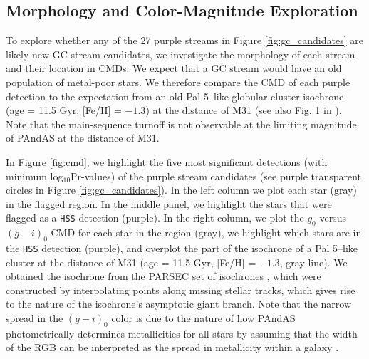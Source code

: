 \documentclass[twocolumn]{aastex631}
\begin{document}
\subsection{Morphology and Color-Magnitude Exploration}\label{sec:CMD}
To explore whether any of the 27 purple streams in Figure \ref{fig:gc_candidates} are likely new GC stream candidates, we investigate the morphology of each stream and their location in CMDs. 
We expect that a GC stream would have an old population of metal-poor stars. We therefore compare the CMD of each purple detection to the expectation from an old Pal 5--like globular cluster isochrone (age = 11.5 Gyr, [Fe/H] = $-1.3$) at the distance of M31 (see also Fig. 1 in ). Note that the main-sequence turnoff is not observable at the limiting magnitude of PAndAS at the distance of M31. 


In Figure \ref{fig:cmd}, we highlight the five most significant detections (with minimum log$_{10}$Pr-values) of the purple stream candidates (see purple transparent circles in Figure \ref{fig:gc_candidates}). 
In the left column we plot each star (gray) in the flagged region. In the middle panel, we highlight the stars that were flagged as a \texttt{HSS} detection (purple). In the right column, we plot the $g_0$ versus $(g-i)_0$ CMD for each star in the region (gray), we highlight which stars are in the \texttt{HSS} detection (purple), and overplot the part of the isochrone of a Pal 5--like cluster at the distance of M31 (age = 11.5 Gyr, [Fe/H] = $-1.3$,  gray line). We obtained the isochrone from the PARSEC set of isochrones \citep{bressan12}, which were constructed by interpolating points along missing stellar tracks, which gives rise to the nature of the isochrone's asymptotic giant branch. 
Note that the narrow spread in the $(g-i)_0$ color is due to the nature of how PAndAS photometrically determines metallicities for all stars by assuming that the width of the RGB can be interpreted as the spread in metallicity within a galaxy \citep[see e.g.,][]{denja14}.
\end{document}
